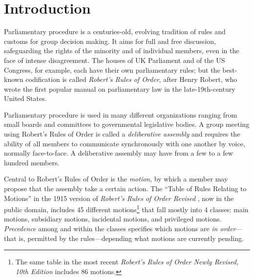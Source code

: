 \documentclass{acm_proc_article-sp}
\begin{document}



\section{Introduction}  %


Parliamentary procedure is a centuries-old, evolving tradition of rules and customs for group decision making. It aims for full and free discussion, safeguarding the rights of the minority and of individual members, even in the face of intense disagreement. The houses of UK Parliament and of the US Congress, for example, each have their own parliamentary rules; but the best-known codification is called \emph{Robert's Rules of Order}, after Henry Robert, who wrote the first popular manual on parliamentary law in the late-19th-century United States.

Parliamentary procedure is used in many different organizations ranging from small boards and committees to governmental legislative bodies. A group meeting using Robert's Rules of Order is called a \emph{deliberative assembly} and requires the ability of all members to communicate synchronously with one another by voice, normally face-to-face. A deliberative assembly may have from a few to a few hundred members.

Central to Robert's Rules of Order is the \emph{motion}, by which a member may propose that the assembly take a certain action. The ``Table of Rules Relating to Motions'' in the 1915 version of \textit{Robert's Rules of Order Revised} \cite{robert:rules}, now in the public domain, includes 45 different motions\footnote{The same table in the most recent \textit{Robert's Rules of Order Newly Revised, 10th Edition} includes 86 motions.} that fall mostly into 4 classes: main motions, subsidiary motions, incidental motions, and privileged motions. \emph{Precedence} among and within the classes specifies which motions are \emph{in order}---that is, permitted by the rules---depending what motions are currently pending.
\end{document}
